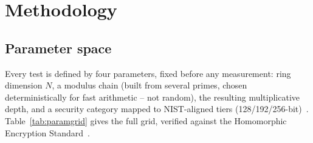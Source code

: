 \section{Methodology}
\label{sec:methodology}

\subsection{Parameter space}

Every test is defined by four parameters, fixed before any measurement: ring dimension $N$, a modulus chain (built from several primes, chosen deterministically for fast arithmetic -- not random), the resulting multiplicative depth, and a security category mapped to NIST-aligned tiers (128/192/256-bit)~\cite{nist-pqc}. Table~\ref{tab:paramgrid} gives the full grid, verified against the Homomorphic Encryption Standard~\cite{hestandard2021,bossuat2024}.

